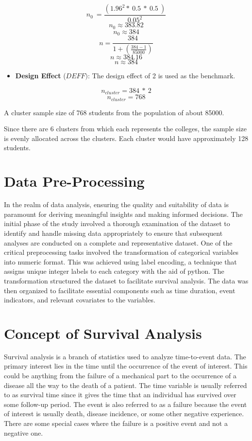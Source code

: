 \documentclass[12pt]{report} %
\begin{document}
\[n_0\ =\frac{\left({1.96}^2\ast\ 0.5\ \ast\ 0.5\ \right)}{{0.05}^2}\]
\[n_0\approx383.82\]
\[n_0\approx384\]
\[n=\frac{384}{1+(\frac{384-1}{85000})}\]
\[n\approx384.16\]
\[n\approx384\]

\begin{itemize}
    \item \textbf{Design Effect} (\({DEFF})\): The design effect of 2 is used as the benchmark.

\end{itemize}
\[n_{cluster}=384\ \ast\ 2\]
\[n_{cluster}=768\]

A cluster sample size of 768 students from the population of about 85000.

Since there are 6 clusters from which each represents the colleges, the sample size is evenly allocated across the clusters. Each cluster would have approximately 128 students.



\section{Data Pre-Processing}

In the realm of data analysis, ensuring the quality and suitability of data is paramount for deriving meaningful insights and making informed decisions. The initial phase of the study involved a thorough examination of the dataset to identify and handle missing data appropriately to ensure that subsequent analyses are conducted on a complete and representative dataset. One of the critical preprocessing tasks involved the transformation of categorical variables into numeric format. This was achieved using label encoding, a technique that assigns unique integer labels to each category with the aid of python. The transformation structured the dataset to facilitate survival analysis. The data was then organized to facilitate essential components such as time duration, event indicators, and relevant covariates to the variables. 

\section{Concept of Survival Analysis}

Survival analysis is a branch of statistics used to analyze time-to-event data. The primary interest lies in the time until the occurrence of the event of interest. This could be anything from the failure of a mechanical part to the occurrence of a disease all the way to the death of a patient. The time variable is usually referred to as survival time since it gives the time that an individual has survived over some follow-up period. The event is also referred to as a failure because the event of interest is usually death, disease incidence, or some other negative experience. There are some special cases where the failure is a positive event and not a negative one.
\end{document}
